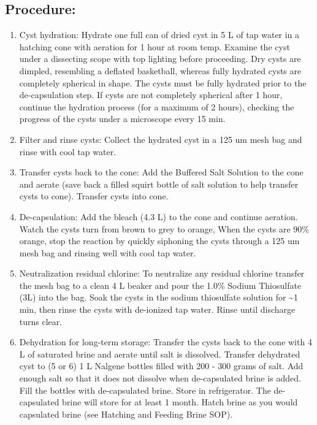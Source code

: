 \documentclass[
]{book}
\providecommand{\tightlist}{%
  \setlength{\itemsep}{0pt}\setlength{\parskip}{0pt}}
\begin{document}
\hypertarget{procedure-4}{%
\subsection{Procedure:}\label{procedure-4}}

\begin{enumerate}
\def\labelenumi{\arabic{enumi}.}
\tightlist
\item
  Cyst hydration: Hydrate one full can of dried cyst in 5 L of tap water in a hatching cone with aeration for 1 hour at room temp. Examine the cyst under a dissecting scope with top lighting before proceeding. Dry cysts are dimpled, resembling a deflated basketball, whereas fully hydrated cysts are completely spherical in shape. The cysts must be fully hydrated prior to the de-capsulation step. If cysts are not completely spherical after 1 hour, continue the hydration process (for a maximum of 2 hours), checking the progress of the cysts under a microscope every 15 min.
\item
  Filter and rinse cysts: Collect the hydrated cyst in a 125 um mesh bag and rinse with cool tap water.
\item
  Transfer cysts back to the cone: Add the Buffered Salt Solution to the cone and aerate (save back a filled squirt bottle of salt solution to help transfer cysts to cone). Transfer cysts into cone.
\item
  De-capsulation: Add the bleach (4.3 L) to the cone and continue aeration. Watch the cysts turn from brown to grey to orange, When the cysts are 90\% orange, stop the reaction by quickly siphoning the cysts through a 125 um mesh bag and rinsing well with cool tap water.
\item
  Neutralization residual chlorine: To neutralize any residual chlorine transfer the mesh bag to a clean 4 L beaker and pour the 1.0\% Sodium Thiosulfate (3L) into the bag. Soak the cysts in the sodium thiosulfate solution for \textasciitilde1 min, then rinse the cysts with de-ionized tap water. Rinse until discharge turns clear.
\item
  Dehydration for long-term storage: Transfer the cysts back to the cone with 4 L of saturated brine and aerate until salt is dissolved. Transfer dehydrated cyst to (5 or 6) 1 L Nalgene bottles filled with 200 - 300 grams of salt. Add enough salt so that it does not dissolve when de-capsulated brine is added. Fill the bottles with de-capsulated brine. Store in refrigerator. The de-capsulated brine will store for at least 1 month. Hatch brine as you would capsulated brine (see Hatching and Feeding Brine SOP).
\end{enumerate}
\end{document}
